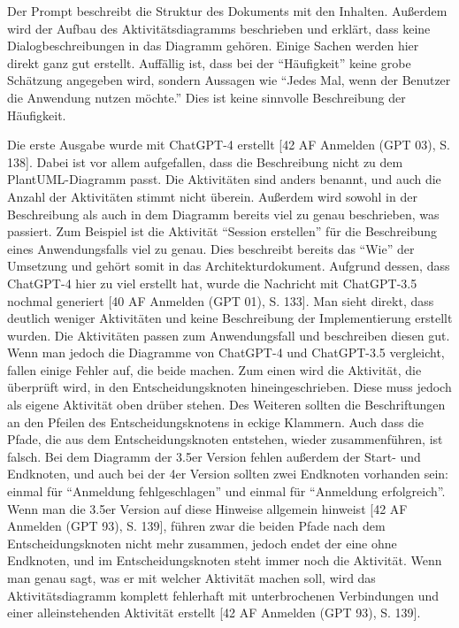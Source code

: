 Der Prompt beschreibt die Struktur des Dokuments mit den Inhalten. Außerdem wird der Aufbau des Aktivitätsdiagramms beschrieben und erklärt, 
dass keine Dialogbeschreibungen in das Diagramm gehören. Einige Sachen werden hier direkt ganz gut erstellt. Auffällig ist, dass bei der 
``Häufigkeit'' keine grobe Schätzung angegeben wird, sondern Aussagen wie ``Jedes Mal, wenn der Benutzer die Anwendung nutzen möchte.'' Dies ist 
keine sinnvolle Beschreibung der Häufigkeit.

Die erste Ausgabe wurde mit ChatGPT-4 erstellt [42 AF Anmelden (GPT 03), S. 138]. Dabei ist vor allem aufgefallen, dass die Beschreibung nicht 
zu dem PlantUML-Diagramm passt. Die Aktivitäten sind anders benannt, und auch die Anzahl der Aktivitäten stimmt nicht überein. Außerdem wird 
sowohl in der Beschreibung als auch in dem Diagramm bereits viel zu genau beschrieben, was passiert. Zum Beispiel ist die Aktivität 
``Session erstellen'' für die Beschreibung eines Anwendungsfalls viel zu genau. Dies beschreibt bereits das ``Wie'' der Umsetzung und gehört 
somit in das Architekturdokument. Aufgrund dessen, dass ChatGPT-4 hier zu viel erstellt hat, wurde die Nachricht mit ChatGPT-3.5 nochmal 
generiert [40 AF Anmelden (GPT 01), S. 133]. Man sieht direkt, dass deutlich weniger Aktivitäten und keine Beschreibung der Implementierung 
erstellt wurden. Die Aktivitäten passen zum Anwendungsfall und beschreiben diesen gut. Wenn man jedoch die Diagramme von ChatGPT-4 und ChatGPT-3.5 
vergleicht, fallen einige Fehler auf, die beide machen. Zum einen wird die Aktivität, die überprüft wird, in den Entscheidungsknoten 
hineingeschrieben. Diese muss jedoch als eigene Aktivität oben drüber stehen. Des Weiteren sollten die Beschriftungen an den Pfeilen des 
Entscheidungsknotens in eckige Klammern. Auch dass die Pfade, die aus dem Entscheidungsknoten entstehen, wieder zusammenführen, ist falsch. 
Bei dem Diagramm der 3.5er Version fehlen außerdem der Start- und Endknoten, und auch bei der 4er Version sollten zwei Endknoten vorhanden sein: 
einmal für ``Anmeldung fehlgeschlagen'' und einmal für ``Anmeldung erfolgreich''. Wenn man die 3.5er Version auf diese Hinweise allgemein hinweist 
[42 AF Anmelden (GPT 93), S. 139], führen zwar die beiden Pfade nach dem Entscheidungsknoten nicht mehr zusammen, jedoch endet der eine ohne 
Endknoten, und im Entscheidungsknoten steht immer noch die Aktivität. Wenn man genau sagt, was er mit welcher Aktivität machen soll, wird das 
Aktivitätsdiagramm komplett fehlerhaft mit unterbrochenen Verbindungen und einer alleinstehenden Aktivität erstellt [42 AF Anmelden (GPT 93), S. 139]. 
